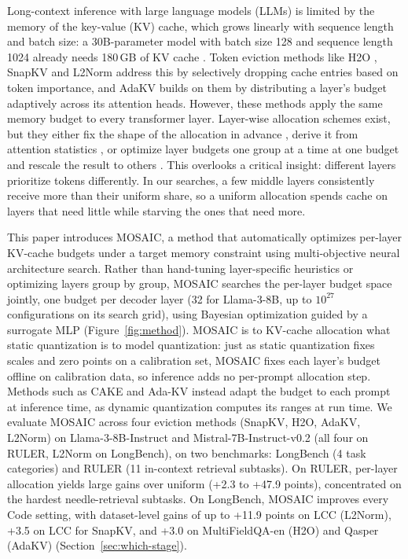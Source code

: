 \documentclass[11pt]{article}
\begin{document}
Long-context inference with large language models (LLMs) is limited by the memory of the key-value (KV) cache, which grows linearly with sequence length and batch size: a 30B-parameter model with batch size 128 and sequence length 1024 already needs 180\,GB of KV cache \citep{zhang2023h2o}. Token eviction methods like H2O \citep{zhang2023h2o}, SnapKV \citep{li2024snapkv} and L2Norm \citep{devoto2024l2norm} address this by selectively dropping cache entries based on token importance, and AdaKV \citep{feng2025adakv} builds on them by distributing a layer's budget adaptively across its attention heads. However, these methods apply the same memory budget to every transformer layer. Layer-wise allocation schemes exist, but they either fix the shape of the allocation in advance \citep{cai2025pyramidkv}, derive it from attention statistics \citep{qin2025cake}, or optimize layer budgets one group at a time at one budget and rescale the result to others \citep{yu2025evolkv}. This overlooks a critical insight: different layers prioritize tokens differently. In our searches, a few middle layers consistently receive more than their uniform share, so a uniform allocation spends cache on layers that need little while starving the ones that need more.

This paper introduces MOSAIC, a method that automatically optimizes per-layer KV-cache budgets under a target memory constraint using multi-objective neural architecture search. Rather than hand-tuning layer-specific heuristics or optimizing layers group by group, MOSAIC searches the per-layer budget space jointly, one budget per decoder layer (32 for Llama-3-8B, up to $10^{27}$ configurations on its search grid), using Bayesian optimization guided by a surrogate MLP (Figure~\ref{fig:method}). MOSAIC is to KV-cache allocation what static quantization is to model quantization: just as static quantization fixes scales and zero points on a calibration set, MOSAIC fixes each layer's budget offline on calibration data, so inference adds no per-prompt allocation step. Methods such as CAKE and Ada-KV instead adapt the budget to each prompt at inference time, as dynamic quantization computes its ranges at run time. We evaluate MOSAIC across four eviction methods (SnapKV, H2O, AdaKV, L2Norm) on Llama-3-8B-Instruct and Mistral-7B-Instruct-v0.2 (all four on RULER, L2Norm on LongBench), on two benchmarks: LongBench (4 task categories) and RULER (11 in-context retrieval subtasks). On RULER, per-layer allocation yields large gains over uniform (+2.3 to +47.9 points), concentrated on the hardest needle-retrieval subtasks. On LongBench, MOSAIC improves every Code setting, with dataset-level gains of up to +11.9 points on LCC (L2Norm), +3.5 on LCC for SnapKV, and +3.0 on MultiFieldQA-en (H2O) and Qasper (AdaKV) (Section~\ref{sec:which-stage}).
\end{document}
